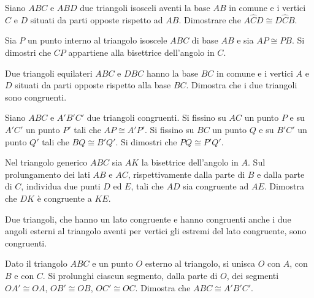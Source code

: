 \begin{multicols}{2}
\begin{esercizio}
\label{ese:2.70}
Siano \(ABC\) e \(ABD\) due triangoli isosceli aventi la base \(AB\) in 
comune e i vertici \(C\) e \(D\) situati da parti opposte rispetto ad 
\(AB\). Dimostrare che \(A\widehat{C}D\cong D\widehat{C}B\).
\end{esercizio}

\begin{esercizio}
\label{ese:2.71}
Sia \(P\) un punto interno al triangolo isoscele \(ABC\) di base \(AB\) e 
sia \(AP\cong PB\). Si dimostri che \(CP\) appartiene alla bisettrice 
dell'angolo in \(C\).
\end{esercizio}

\begin{esercizio}
\label{ese:2.72}
Due triangoli equilateri \(ABC\) e \(DBC\) hanno la base \(BC\) in comune e 
i vertici \(A\) e \(D\) situati da parti opposte rispetto alla base \(BC\). 
Dimostra che i due triangoli sono congruenti.
\end{esercizio}

\begin{esercizio}
\label{ese:2.73}
Siano \(ABC\) e \(A'B'C'\) due triangoli congruenti. Si fissino su \(AC\) 
un punto \(P\) e su \(A'C'\) un punto \(P'\) tali che \(AP\cong A'P'\). Si 
fissino su \(BC\) un punto \(Q\) e su \(B'C'\) un punto \(Q'\) tali che 
\(BQ\cong B'Q'\). Si dimostri che \(PQ\cong P'Q'\).
\end{esercizio}

\begin{esercizio}
\label{ese:2.74}
Nel triangolo generico \(ABC\) sia \(AK\) la bisettrice dell'angolo in 
\(A\). Sul prolungamento dei lati \(AB\) e \(AC\), rispettivamente dalla 
parte di \(B\) e dalla parte di \(C\), individua due punti \(D\) ed \(E\), 
tali che \(AD\) sia congruente ad \(AE\). Dimostra che \(DK\) è congruente 
a \(KE\).
\end{esercizio}

\begin{esercizio}
\label{ese:2.75}
Due triangoli, che hanno un lato congruente e hanno congruenti anche 
i due angoli esterni al triangolo aventi per vertici gli estremi del 
lato congruente, sono congruenti. 
\end{esercizio}

\begin{esercizio}
\label{ese:2.76}
Dato il triangolo \(ABC\) e un punto \(O\) esterno al triangolo, si 
unisca \(O\) con \(A\), con \(B\) e con \(C\). Si prolunghi ciascun segmento, 
dalla parte di \(O\), dei segmenti \(OA'\cong OA\), \(OB'\cong OB\), 
\(OC'\cong OC\). Dimostra che \(ABC\cong A'B'C'\).
\end{esercizio}


\end{multicols}
